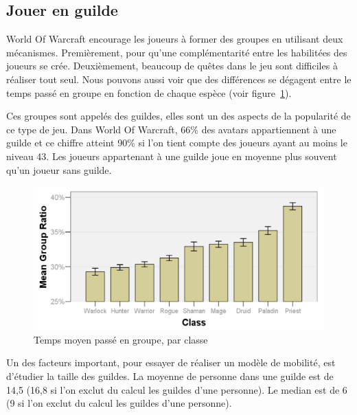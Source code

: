 \documentclass[11pt,a4paper]{article}
\begin{document}
\subsection{Jouer en guilde}
World Of Warcraft encourage les joueurs à former des groupes en utilisant deux mécanismes. Premièrement, pour qu'une complémentarité entre les habilitées des joueurs se crée. Deuxièmement, beaucoup de quêtes dans le jeu sont difficiles à réaliser tout seul. Nous pouvons aussi voir que des différences se dégagent entre le temps passé en groupe en fonction de chaque espèce (voir figure~\ref{tabltimegroup}).
\par Ces groupes sont appelés des guildes, elles sont un des aspects de la popularité de ce type de jeu. Dans World Of Warcraft, 66\% des avatars appartiennent à une guilde et ce chiffre atteint 90\% si l'on tient compte des joueurs ayant au moins le niveau 43. Les joueurs appartenant à une guilde joue en moyenne plus souvent qu'un joueur sans guilde. 
	\begin{figure}[!h]
        \centering
        \includegraphics[scale=0.95]{./images/tabltimegroup.png}
        \caption{Temps moyen passé en groupe, par classe}
        \label{tabltimegroup}
        \end{figure}
\par Un des facteurs important, pour essayer de réaliser un modèle de mobilité, est d'étudier la taille des guildes. La moyenne de personne dans une guilde est de 14,5 (16,8 si l'on exclut du calcul les guildes d'une personne). Le median est de 6 (9 si l'on exclut du calcul les guildes d'une personne). 
\end{document}
